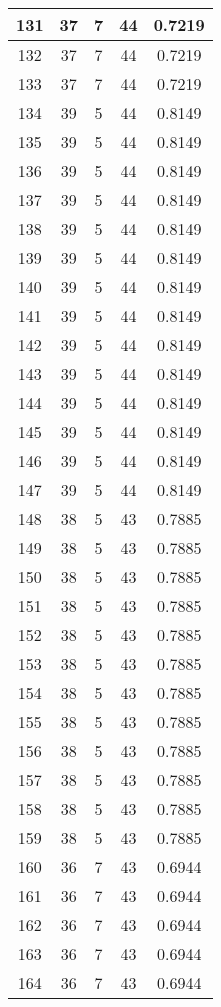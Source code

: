 \documentclass[letterpaper, 12pt]{article}
\begin{document}
\begin{longtable}{|c|c|c|c|c|}
\hline
131 & 37 & 7 & 44 & 0.7219 \\
\hline
132 & 37 & 7 & 44 & 0.7219 \\
\hline
133 & 37 & 7 & 44 & 0.7219 \\
\hline
134 & 39 & 5 & 44 & 0.8149 \\
\hline
135 & 39 & 5 & 44 & 0.8149 \\
\hline
136 & 39 & 5 & 44 & 0.8149 \\
\hline
137 & 39 & 5 & 44 & 0.8149 \\
\hline
138 & 39 & 5 & 44 & 0.8149 \\
\hline
139 & 39 & 5 & 44 & 0.8149 \\
\hline
140 & 39 & 5 & 44 & 0.8149 \\
\hline
141 & 39 & 5 & 44 & 0.8149 \\
\hline
142 & 39 & 5 & 44 & 0.8149 \\
\hline
143 & 39 & 5 & 44 & 0.8149 \\
\hline
144 & 39 & 5 & 44 & 0.8149 \\
\hline
145 & 39 & 5 & 44 & 0.8149 \\
\hline
146 & 39 & 5 & 44 & 0.8149 \\
\hline
147 & 39 & 5 & 44 & 0.8149 \\
\hline
148 & 38 & 5 & 43 & 0.7885 \\
\hline
149 & 38 & 5 & 43 & 0.7885 \\
\hline
150 & 38 & 5 & 43 & 0.7885 \\
\hline
151 & 38 & 5 & 43 & 0.7885 \\
\hline
152 & 38 & 5 & 43 & 0.7885 \\
\hline
153 & 38 & 5 & 43 & 0.7885 \\
\hline
154 & 38 & 5 & 43 & 0.7885 \\
\hline
155 & 38 & 5 & 43 & 0.7885 \\
\hline
156 & 38 & 5 & 43 & 0.7885 \\
\hline
157 & 38 & 5 & 43 & 0.7885 \\
\hline
158 & 38 & 5 & 43 & 0.7885 \\
\hline
159 & 38 & 5 & 43 & 0.7885 \\
\hline
160 & 36 & 7 & 43 & 0.6944 \\
\hline
161 & 36 & 7 & 43 & 0.6944 \\
\hline
162 & 36 & 7 & 43 & 0.6944 \\
\hline
163 & 36 & 7 & 43 & 0.6944 \\
\hline
164 & 36 & 7 & 43 & 0.6944 \\

\end{longtable}
\end{document}
